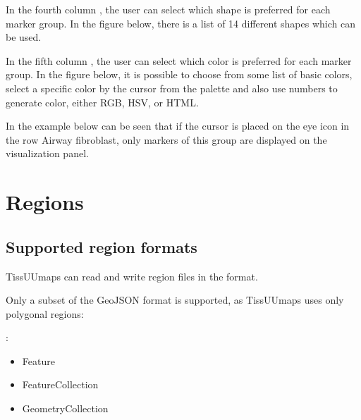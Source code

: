 \documentclass[letterpaper,10pt,english,openany,oneside]{sphinxmanual}
\begin{document}
\sphinxAtStartPar
In the fourth column , the user can select which shape is preferred for each marker group. In the figure below, there is a list of 14 different shapes which can be used.

\sphinxAtStartPar
{}

\sphinxAtStartPar
In the fifth column , the user can select which color is preferred for each marker group. In the figure below, it is possible to choose from some list of basic colors, select a specific color by the cursor from the palette and also use numbers to generate color, either RGB, HSV, or HTML.

\sphinxAtStartPar
{}

\sphinxAtStartPar
In the example below can be seen that if the cursor is placed on the eye icon in the row Airway fibroblast, only markers of this group are displayed on the visualization panel.

\sphinxAtStartPar
{}

\sphinxstepscope


\section{Regions}
\label{\detokenize{docs/starting/regions:regions}}\label{\detokenize{docs/starting/regions::doc}}

\subsection{Supported region formats}
\label{\detokenize{docs/starting/regions:supported-region-formats}}
\sphinxAtStartPar
TissUUmaps can read and write region files in the  format.

\sphinxAtStartPar
Only a subset of the GeoJSON format is supported, as TissUUmaps uses only polygonal regions:

\sphinxAtStartPar
{}:
\begin{itemize}
\item {} 
\sphinxAtStartPar
Feature

\item {} 
\sphinxAtStartPar
FeatureCollection

\item {} 
\sphinxAtStartPar
GeometryCollection

\end{itemize}
\end{document}
